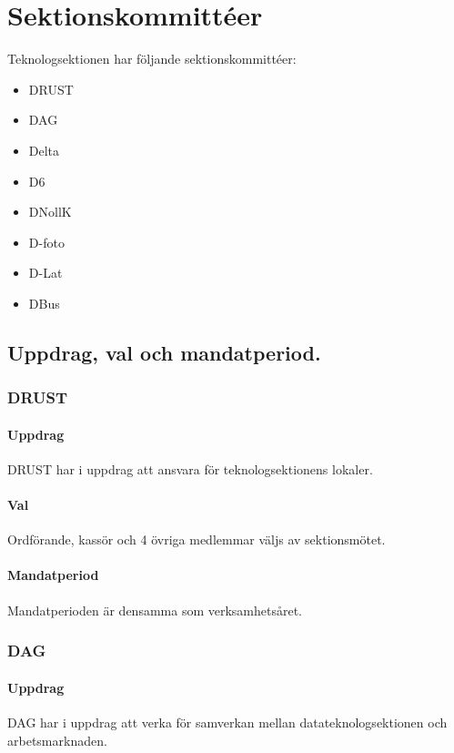 \section{Sektionskommittéer}

Teknologsektionen har följande sektionskommittéer: 
\begin{itemize}
  \item DRUST 
  \item DAG 
  \item Delta 
  \item D6 
  \item DNollK
  \item D-foto
  \item D-Lat
  \item DBus
\end{itemize}

\subsection{Uppdrag, val och mandatperiod.}

\subsubsection{DRUST} 

\paragraph{Uppdrag}
DRUST har i uppdrag att ansvara för teknologsektionens lokaler.

\paragraph{Val}
Ordförande, kassör och 4 övriga medlemmar väljs av sektionsmötet. 

\paragraph{Mandatperiod}
Mandatperioden är densamma som verksamhetsåret. 

\subsubsection{DAG}

\paragraph{Uppdrag} 
DAG har i uppdrag att verka för samverkan mellan datateknologsektionen och arbetsmarknaden. 

